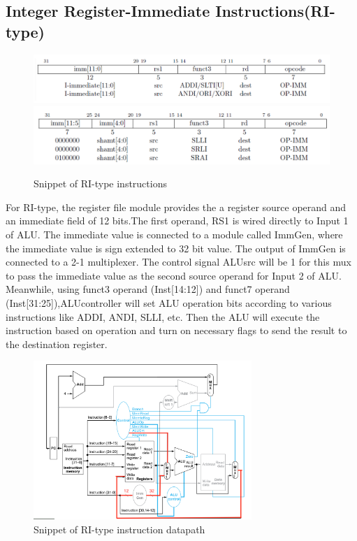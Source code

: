 \documentclass[20pt]{article}
\begin{document}
\subsection{Integer Register-Immediate Instructions(RI-type)}

\begin{figure}[h]
\includegraphics[width=\linewidth]{RI-type}
\includegraphics[width=\linewidth]{SI-type}
\caption{Snippet of RI-type instructions}
\end{figure}

For RI-type, the register file module provides the a register source operand and an immediate field of 12 bits.The first operand, RS1 is wired directly to Input 1 of ALU. The immediate value is connected to a module called ImmGen, where the immediate value is sign extended to 32 bit value. The output of ImmGen is connected to a 2-1 multiplexer. The control signal ALUsrc will be 1 for this mux to pass the immediate value as the second source operand for Input 2 of ALU. Meanwhile, using funct3 operand (Inst[14:12]) and funct7 operand (Inst[31:25]),ALUcontroller will set ALU operation bits according to various instructions like ADDI, ANDI, SLLI, etc. Then the ALU will execute the instruction based on operation and turn on necessary flags to send the result to the destination register.

\begin{figure}[h]
\includegraphics[width=0.9\linewidth, height=6cm]{RIdatapath}
\caption{Snippet of RI-type instruction datapath}
\end{figure}
\end{document}
